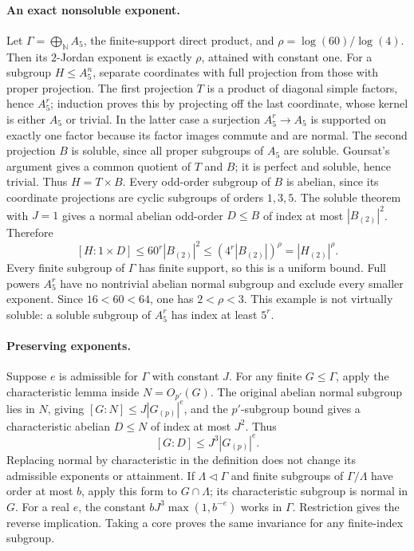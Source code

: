 \paragraph{An exact nonsoluble exponent.}
Let \(\Gamma=\bigoplus_{\mathbb N}A_5\), the finite-support direct
product, and \(\rho=\log(60)/\log(4)\).
Then its \(2\)-Jordan exponent is exactly \(\rho\), attained with
constant one. For a subgroup \(H\le A_5^n\), separate coordinates
with full projection from those with proper projection.
The first projection \(T\) is a product of diagonal simple
factors, hence \(A_5^r\); induction proves this by projecting off
the last coordinate, whose kernel is either \(A_5\) or trivial.
In the latter case a surjection \(A_5^r\to A_5\) is supported
on exactly one factor because its factor images commute and
are normal. The second projection \(B\) is soluble, since
all proper subgroups of \(A_5\) are soluble.
Goursat's argument gives a common quotient of \(T\) and \(B\);
it is perfect and soluble, hence trivial. Thus \(H=T\times B\).
Every odd-order subgroup of \(B\) is abelian, since its coordinate
projections are cyclic subgroups of orders \(1,3,5\).
The soluble theorem with \(J=1\) gives a normal abelian odd-order
\(D\le B\) of index at most \(|B_{(2)}|^2\). Therefore
\[
 [H:1\times D]\le60^r|B_{(2)}|^2
 \le(4^r|B_{(2)}|)^\rho=|H_{(2)}|^\rho.
\]
Every finite subgroup of \(\Gamma\) has finite support, so this
is a uniform bound. Full powers \(A_5^r\) have no nontrivial
abelian normal subgroup and exclude every smaller exponent.
Since \(16<60<64\), one has \(2<\rho<3\).
This example is not virtually soluble: a soluble subgroup of
\(A_5^r\) has index at least \(5^r\).

\paragraph{Preserving exponents.}
Suppose \(e\) is admissible for \(\Gamma\) with constant \(J\).
For any finite \(G\le\Gamma\), apply the characteristic lemma
inside \(N=O_{p'}(G)\). The original abelian normal subgroup
lies in \(N\), giving \([G:N]\le J|G_{(p)}|^e\), and the
\(p'\)-subgroup bound gives a characteristic abelian \(D\le N\)
of index at most \(J^2\). Thus
\[
 [G:D]\le J^3|G_{(p)}|^e.
\]
Replacing normal by characteristic in the definition does not
change its admissible exponents or attainment.
If \(\Lambda\lhd\Gamma\) and finite subgroups of
\(\Gamma/\Lambda\) have order at most \(b\), apply this form
to \(G\cap\Lambda\); its characteristic subgroup is normal in
\(G\). For a real \(e\), the constant
\(bJ^3\max(1,b^{-e})\) works in \(\Gamma\).
Restriction gives the reverse implication. Taking a core proves
the same invariance for any finite-index subgroup.

